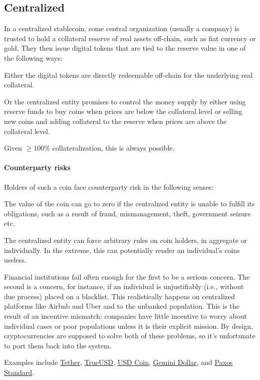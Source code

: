 \documentclass[10pt]{article}
\begin{document}
\subsection{Centralized} 
In a centralized stablecoin, some central organization (usually a company) is trusted to hold a collateral reserve of real assets off-chain, such as fiat currency or gold. They then issue digital tokens that are tied to the reserve value in one of the following ways:
\begin{compactitem}
	\item Either the digital tokens are directly redeemable off-chain for the underlying real collateral.
	\item Or the centralized entity promises to control the money supply by either using reserve funds to buy coins when prices are below the collateral level or selling new coins and adding collateral to the reserve when prices are above the collateral level.
\end{compactitem}
Given $\geq 100\%$ collateralization, this is always possible. 

\paragraph{Counterparty risks} Holders of such a coin face counterparty risk in the following senses:
\begin{compactenum}
	\item The value of the coin can go to zero if the centralized entity is unable to fulfill its obligations, such as a result of fraud, mismanagement, theft, government seizure etc.
	\item The centralized entity can force arbitrary rules on coin holders, in aggregate or individually. In the extreme, this can potentially render an individual's coins useless.
\end{compactenum}
Financial institutions fail often enough for the first to be a serious concern. The second is a concern, for instance, if an individual is unjustifiably (i.e., without due process) placed on a blacklist. This realistically happens on centralized platforms like Airbnb and Uber and to the unbanked population. This is the result of an incentive mismatch: companies have little incentive to worry about individual cases or poor populations unless it is their explicit mission. By design, cryptocurrencies are supposed to solve both of these problems, so it's unfortunate to port them back into the system.

Examples include \href{https://tether.to/}{Tether}, \href{https://www.trusttoken.com/trueusd/}{TrueUSD}, \href{https://www.circle.com/en-gb/usdc}{USD Coin}, \href{https://gemini.com/dollar/}{Gemini Dollar}, and \href{https://www.paxos.com/standard/}{Paxos Standard}.
\end{document}
